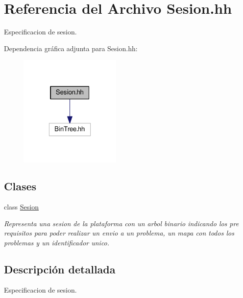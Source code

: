 \hypertarget{_sesion_8hh}{}\section{Referencia del Archivo Sesion.\+hh}
\label{_sesion_8hh}


Especificacion de sesion.  


Dependencia gráfica adjunta para Sesion.\+hh\+:
\nopagebreak
\begin{figure}[H]
\begin{center}
\leavevmode
\includegraphics[width=142pt]{_sesion_8hh__incl}
\end{center}
\end{figure}
\subsection*{Clases}
\begin{DoxyCompactItemize}
\item 
class \mbox{\hyperlink{class_sesion}{Sesion}}
\begin{DoxyCompactList}\small\item\em Representa una sesion de la plataforma con un arbol binario indicando los pre requisitos para poder realizar un envio a un problema, un mapa con todos los problemas y un identificador unico. \end{DoxyCompactList}\end{DoxyCompactItemize}


\subsection{Descripción detallada}
Especificacion de sesion. 

